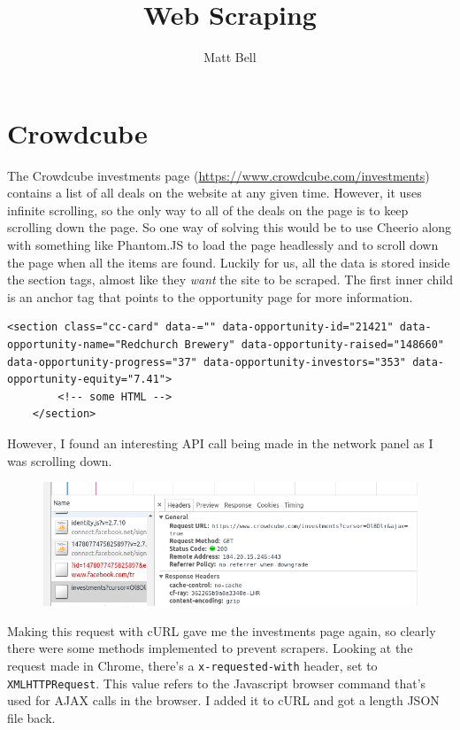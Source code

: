 \documentclass{article}
\title{Web Scraping}
\author{Matt Bell}
\begin{document}
\maketitle

\section*{Crowdcube}
The Crowdcube investments page (\url{https://www.crowdcube.com/investments})
contains a list of all deals on the website at any given time. However, it uses
infinite scrolling, so the only way to all of the deals on the page is to keep
scrolling down the page. So one way of solving this would be to use Cheerio
along with something like Phantom.JS to load the page headlessly and to scroll
down the page when all the items are found. Luckily for us, all the data is
stored inside the section tags, almost like they \textit{want} the site to be
scraped. The first inner child is an anchor tag that points to the opportunity
page for more information.

\begin{verbatim}
<section class="cc-card" data-="" data-opportunity-id="21421" data-opportunity-name="Redchurch Brewery" data-opportunity-raised="148660" data-opportunity-progress="37" data-opportunity-investors="353" data-opportunity-equity="7.41">
        <!-- some HTML -->
    </section>
\end{verbatim}

However, I found an interesting API call being made in the network panel as I
was scrolling down.

\begin{figure}[h]
    \centering
    \includegraphics[scale=0.5]{cc_json}
\end{figure}

Making this request with cURL gave me the investments page again, so clearly
there were some methods implemented to prevent scrapers. Looking at the request
made in Chrome, there's a \texttt{x-requested-with} header, set to
\texttt{XMLHTTPRequest}. This value refers to the Javascript browser command
that's used for AJAX calls in the browser. I added it to cURL and got a length
JSON file back.
\end{document}
